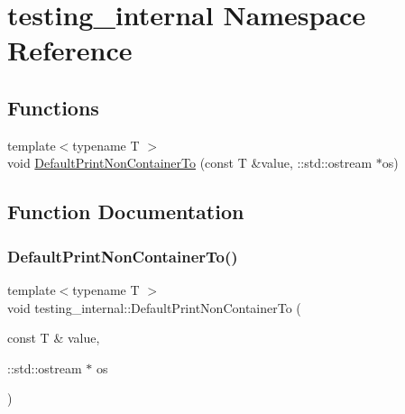 \hypertarget{namespacetesting__internal}{}\section{testing\+\_\+internal Namespace Reference}
\label{namespacetesting__internal}
\subsection*{Functions}
\begin{DoxyCompactItemize}
\item 
{\footnotesize template$<$typename T $>$ }\\void \hyperlink{namespacetesting__internal_a3f49d3d0c996242f9d383c850097a656}{Default\+Print\+Non\+Container\+To} (const T \&value, \+::std\+::ostream $\ast$os)
\end{DoxyCompactItemize}


\subsection{Function Documentation}
\mbox{\label{namespacetesting__internal_a3f49d3d0c996242f9d383c850097a656}} 
\subsubsection{\texorpdfstring{Default\+Print\+Non\+Container\+To()}{DefaultPrintNonContainerTo()}}
{\footnotesize\ttfamily template$<$typename T $>$ \\
void testing\+\_\+internal\+::\+Default\+Print\+Non\+Container\+To (\begin{DoxyParamCaption}\item[{const T \&}]{value,  }\item[{\+::std\+::ostream $\ast$}]{os }\end{DoxyParamCaption})}


